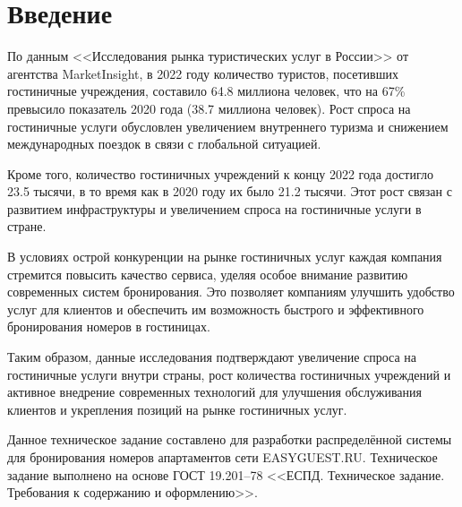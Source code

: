 \section*{Введение}
По данным <<Исследования рынка туристических услуг в России>> от агентства MarketInsight, в 2022 году количество туристов, посетивших гостиничные учреждения, составило 64.8 миллиона человек, что на 67\% превысило показатель 2020 года (38.7 миллиона человек). Рост спроса на гостиничные услуги обусловлен увеличением внутреннего туризма и снижением международных поездок в связи с глобальной ситуацией.

Кроме того, количество гостиничных учреждений к концу 2022 года достигло 23.5 тысячи, в то время как в 2020 году их было 21.2 тысячи. Этот рост связан с развитием инфраструктуры и увеличением спроса на гостиничные услуги в стране.

В условиях острой конкуренции на рынке гостиничных услуг каждая компания стремится повысить качество сервиса, уделяя особое внимание развитию современных систем бронирования. Это позволяет компаниям улучшить удобство услуг для клиентов и обеспечить им возможность быстрого и эффективного бронирования номеров в гостиницах.

Таким образом, данные исследования подтверждают увеличение спроса на гостиничные услуги внутри страны, рост количества гостиничных учреждений и активное внедрение современных технологий для улучшения обслуживания клиентов и укрепления позиций на рынке гостиничных услуг.

Данное техническое задание составлено для разработки распределённой системы для  бронирования номеров апартаментов сети EASYGUEST.RU. Техническое задание выполнено на основе ГОСТ 19.201--78 <<ЕСПД. Техническое задание. Требования к содержанию и оформлению>>.